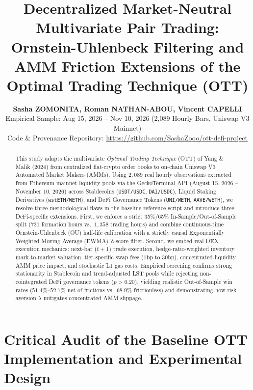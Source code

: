 \documentclass[11pt,a4paper]{article}
\title{\vspace{-1.1cm}\textbf{Decentralized Market-Neutral Multivariate Pair Trading:\\Ornstein-Uhlenbeck Filtering and AMM Friction Extensions of the Optimal Trading Technique (OTT)}\vspace{-0.25cm}}
\author{\textbf{Sasha ZOMONITA, Roman NATHAN-ABOU, Vincent CAPELLI} \\[2pt] \small Empirical Sample: Aug 15, 2026 -- Nov 10, 2026 (2,089 Hourly Bars, Uniswap V3 Mainnet) \\[1pt] \small Code \& Provenance Repository: \url{https://github.com/SashaZooo/ott-defi-project}}
\date{\vspace{-0.55cm}}
\begin{document}
\maketitle
\begin{abstract}
\noindent This study adapts the multivariate \textit{Optimal Trading Technique} (OTT) of Yang \& Malik (2024) from centralized fiat-crypto order books to on-chain Uniswap V3 Automated Market Makers (AMMs). Using $2,089$ real hourly observations extracted from Ethereum mainnet liquidity pools via the GeckoTerminal API (August 15, 2026 -- November 10, 2026) across Stablecoins (\texttt{USDT/USDC}, \texttt{DAI/USDC}), Liquid Staking Derivatives (\texttt{wstETH/WETH}), and DeFi Governance Tokens (\texttt{UNI/WETH}, \texttt{AAVE/WETH}), we resolve three methodological flaws in the baseline reference script and introduce three DeFi-specific extensions. First, we enforce a strict 35\%/65\% In-Sample/Out-of-Sample split ($731$ formation hours vs.\ $1,358$ trading hours) and combine continuous-time Ornstein-Uhlenbeck (OU) half-life calibration with a strictly causal Exponentially Weighted Moving Average (EWMA) Z-score filter. Second, we embed real DEX execution mechanics: next-bar ($t+1$) trade execution, hedge-ratio-weighted inventory mark-to-market valuation, tier-specific swap fees ($1\text{bp}$ to $30\text{bp}$), concentrated-liquidity AMM price impact, and stochastic L1 gas costs. Empirical screening confirms strong stationarity in Stablecoin and trend-adjusted LST pools while rejecting non-cointegrated DeFi governance tokens ($p > 0.20$), yielding realistic Out-of-Sample win rates ($51.4\%$--$52.7\%$ net of frictions vs.\ $68.9\%$ frictionless) and demonstrating how risk aversion $\lambda$ mitigates concentrated AMM slippage.
\end{abstract}
\section{Critical Audit of the Baseline OTT Implementation and Experimental Design}
\end{document}
